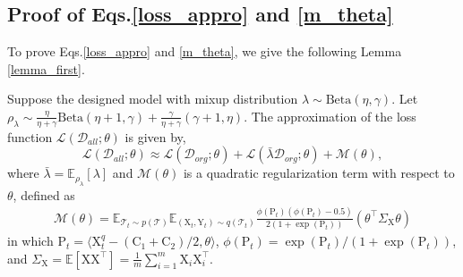 \subsection{Proof of Eqs.\ref{loss_appro} and \ref{m_theta}}
To prove Eqs.\ref{loss_appro} and \ref{m_theta}, we give the following Lemma \ref{lemma_first}.

\begin{lemma}
\label{lemma_first}
Suppose the designed model with mixup distribution $\lambda \sim \text{Beta}(\eta,\gamma)$. Let $\rho_\lambda \sim \frac{\eta}{\eta\!+\!\gamma}\text{Beta}(\eta\!+\!1,\gamma)\!+\!\frac{\gamma}{\eta\!+\!\gamma}(\gamma\!+\!1,\eta)$. The approximation of the loss function $\mathcal{L}(\mathcal{D}_{all};\theta)$ is given by,
\begin{equation}
    \mathcal{L}(\mathcal{D}_{all};\theta)\approx
    \mathcal{L}(\mathcal{D}_{org};\theta)\!+\!\mathcal{L}(\bar{\lambda}\mathcal{D}_{org};\theta)\!+\!\mathcal{M}(\theta),
\end{equation}
where $\bar{\lambda}\!=\!\mathbb E_{\rho_\lambda}[\lambda]$ and $\mathcal{M}(\theta)$ is a quadratic regularization term with respect to $\theta$, defined as 
\begin{equation}
\begin{aligned}
    \mathcal{M}(\theta)\!=\!\mathbb E_{\mathcal{T}_t\sim p(\mathcal{T})}\mathbb E_{(\mathrm{X}_t,\mathrm{Y}_t)\sim q(\mathcal{T}_t)} \frac{\phi(\mathrm{P}_t)(\phi(\mathrm{P}_t)\!-\!0.5)}{2(1\!+\!\exp{(\mathrm{P}_t)})}(\theta^\top\Sigma_\mathrm{X}\theta)
\end{aligned}
\end{equation}
in which $\mathrm
P_t\!=\!\langle\mathrm{X}_t^q \! - \! (\mathrm{C}_1 \! + \! \mathrm{C}_2)/2,\theta\rangle$, $\phi(\mathrm{P}_t)\!=\!\exp(\mathrm{P}_t)/(1\!+\!\exp(\mathrm{P}_t))$, and $\Sigma_\mathrm{X}\!=\!\mathbb E[\mathrm{X}\mathrm{X}^\top]\!=\!\frac{1}{m}\sum\nolimits_{i=1}^m\mathrm{X}_i\mathrm{X}_i^\top$.
\end{lemma}

